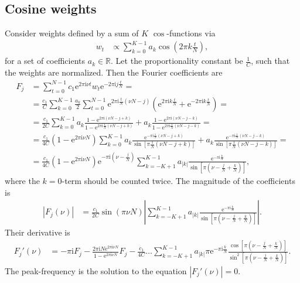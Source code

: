 \documentclass[english, parskip=full]{scrartcl}
\newcommand{\kla}{}
\newcommand{\klam}{}
\renewcommand{\i}{\text{i}}
\newcommand{\e}{\text{e}}
\begin{document}
\subsection{Cosine weights}
Consider weights defined by a sum of $K$ $\cos$-functions via
\begin{align}
w_t &\propto \sum_{k=0}^{K-1} a_k\cos \kla\left( {2\pi k \frac{t}{N}} \right),
\end{align}
for a set of coefficients $a_k\in\mathbb{R}$.
Let the proportionality constant be $\frac{1}{C}$, such that the weights are normalized.
Then the Fourier coefficients are
\begin{align}
F_j &= \sum_{t=0}^{N-1} c_1\e^{2\pi\i \nu t} w_t \e^{-2\pi\i j\frac{t}{N}} = \\
&= \frac{c_1}{C} \sum_{k=0}^{K-1} \frac{a_k}{2} \sum_{t=0}^{N-1} \e^{2\pi\i\frac{t}{N}(\nu N - j)} \kla\left( {\e^{2\pi\i k \frac{t}{N}} + \e^{-2\pi\i k \frac{t}{N}}} \right) = \\
&= \frac{c_1}{2C}\sum_{k=0}^{K-1} a_k \frac{1 - \e^{2\pi\i (\nu N - j + k)}}{1 - \e^{2\pi\i \frac{1}{N}(\nu N - j + k)}} + a_k\frac{1 - \e^{2\pi\i (\nu N - j - k)}}{1 - \e^{2\pi\i \frac{1}{N}(\nu N - j - k)}} = \\
&= \frac{c_1}{4C} \kla\left( {1 - \e^{2\pi\i\nu N}} \right) \sum_{k=0}^{K-1} a_k \frac{\e^{-\pi\i \frac{1}{N}(\nu N - j + k)}}{\sin \klam\left[ {\pi \frac{1}{N}(\nu N - j + k)} \right] } + a_k \frac{\e^{-\pi\i \frac{1}{N}(\nu N - j - k)}}{\sin \klam\left[ {\pi \frac{1}{N}(\nu N - j - k)} \right] } = \\
&= \frac{c_1}{4C} \kla\left( {1 - \e^{2\pi\i\nu N}} \right) \e^{-\pi\i \kla\left( { \nu - \frac{j}{N}} \right) }  \sum_{k=-K+1}^{K-1} a_{|k|} \frac{\e^{-\pi\i \frac{k}{N}}}{\sin \klam\left[ {\pi (\nu - \frac{j}{N} + \frac{k}{N})} \right] },
\end{align}
where the $k=0$-term should be counted twice. 
The magnitude of the coefficients is
\begin{align}
|F_j(\nu)| &= \frac{c_1}{2C}\sin\kla\left( {\pi\nu N} \right) \left\vert \sum_{k=-K+1}^{K-1} a_{|k|} \frac{\e^{-\pi\i \frac{k}{N}}}{\sin \klam\left[ {\pi (\nu - \frac{j}{N} + \frac{k}{N})} \right] } \right\vert.
\end{align}
Their derivative is
\begin{align}
F_j'(\nu) &= -\pi\i F_j - \frac{2\pi\i N \e^{2\pi\i\nu N}}{1 - \e^{2\pi\i\nu N}}F_j - \frac{c_1}{4C} \dots \sum_{k=-K+1}^{K-1} a_{|k|} \pi \e^{-\pi\i\frac{k}{N}} \frac{\cos \klam\left[ {\pi (\nu - \frac{j}{N} + \frac{k}{N})} \right]}{\sin^2 \klam\left[ {\pi (\nu - \frac{j}{N} + \frac{k}{N})} \right]}.
\end{align}
The peak-frequency is the solution to the equation $|F_j'(\nu)| = 0$.


\end{document}
